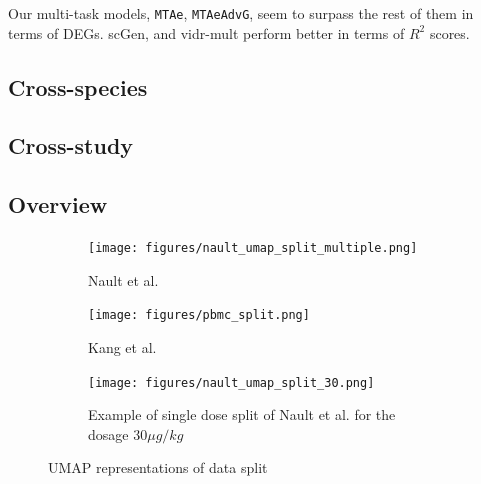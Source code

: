 \documentclass[12pt, a4paper]{article}
\begin{document}
Our multi-task models, \verb|MTAe|, \verb|MTAeAdvG|, seem to surpass the rest of them in terms of DEGs. scGen, and vidr-mult perform better in terms of $R^2$ scores.

\subsection{Cross-species}

\subsection{Cross-study}


\subsection{Overview}

\begin{figure}[h!]
    \centering
    \begin{subfigure}[t]{0.48\textwidth}
        \centering
        \texttt{[image: figures/nault\_umap\_split\_multiple.png]}
        \caption{Nault et al. \cite{nault2021single,nault2022benchmarking}}
        \label{fig:nault_umap}
    \end{subfigure}
    \hfill
    \begin{subfigure}[t]{0.48\textwidth}
        \centering
        \texttt{[image: figures/pbmc\_split.png]}
        \caption{Kang et al. \cite{kanaGenerativeModelingSinglecell2023}}
        \label{fig:pbmc_umap}
    \end{subfigure}
    \begin{subfigure}[b]{0.48\textwidth}
        \centering
        \texttt{[image: figures/nault\_umap\_split\_30.png]}
        \caption{Example of single dose split of Nault et al. \cite{kanaGenerativeModelingSinglecell2023} for the dosage $30 \mu g/kg$}
        \label{fig:pbmc_umap}
    \end{subfigure}    
    \caption{UMAP representations of data split}
    \label{fig:umap_side_by_side}
\end{figure}


\end{document}

